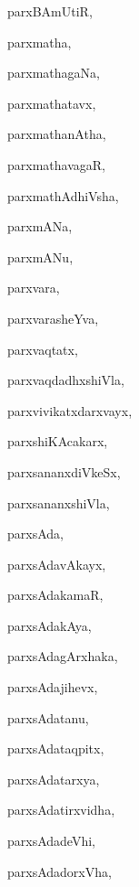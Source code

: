 \begin{multicols}{3}
{\noindent
{parxBAmUtiR}, \pageref{parxBAmUtiR}

\noindent
{parxmatha}, \pageref{parxmatha}

\noindent
{parxmathagaNa}, \pageref{parxmathagaNa}

\noindent
{parxmathatavx}, \pageref{parxmathatavx}

\noindent
{parxmathanAtha}, \pageref{parxmathanAtha}

\noindent
{parxmathavagaR}, \pageref{parxmathavagaR}

\noindent
{parxmathAdhiVsha}, \pageref{parxmathAdhiVsha}

\noindent
{parxmANa}, \pageref{parxmANa}

\noindent
{parxmANu}, \pageref{parxmANu}

\noindent
{parxvara}, \pageref{parxvara}

\noindent
{parxvarasheYva}, \pageref{parxvarasheYva}

\noindent
{parxvaqtatx}, \pageref{parxvaqtatx}

\noindent
{parxvaqdadhxshiVla}, \pageref{parxvaqdadhxshiVla}

\noindent
{parxvivikatxdarxvayx}, \pageref{parxvivikatxdarxvayx}

\noindent
{parxshiKAcakarx}, \pageref{parxshiKAcakarx}

\noindent
{parxsananxdiVkeSx}, \pageref{parxsananxdiVkeSx}

\noindent
{parxsananxshiVla}, \pageref{parxsananxshiVla}

\noindent
{parxsAda}, \pageref{parxsAda}

\noindent
{parxsAdavAkayx}, \pageref{parxsAdavAkayx}

\noindent
{parxsAdakamaR}, \pageref{parxsAdakamaR}

\noindent
{parxsAdakAya}, \pageref{parxsAdakAya}

\noindent
{parxsAdagArxhaka}, \pageref{parxsAdagArxhaka}

\noindent
{parxsAdajihevx}, \pageref{parxsAdajihevx}

\noindent
{parxsAdatanu}, \pageref{parxsAdatanu}

\noindent
{parxsAdataqpitx}, \pageref{parxsAdataqpitx}

\noindent
{parxsAdatarxya}, \pageref{parxsAdatarxya}

\noindent
{parxsAdatirxvidha}, \pageref{parxsAdatirxvidha}

\noindent
{parxsAdadeVhi}, \pageref{parxsAdadeVhi}

\noindent
{parxsAdadorxVha}, \pageref{parxsAdadorxVha}

}
\end{multicols}
